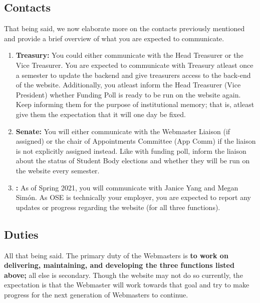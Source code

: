 \documentclass[a4paper]{article}
\begin{document}
\subsection{Contacts}

\noindent That being said, we now elaborate more on the contacts previously mentioned and provide a brief overview of what you are expected to communicate.

\begin{enumerate}
  \item \textbf{Treasury:} You could either communicate with the Head Treasurer or the Vice Treasurer. You are expected to communicate with Treasury atleast once a semester to update the backend and give treasurers access to the back-end of the website. Additionally, you atleast inform the Head Treasurer (Vice President) whether Funding Poll is ready to be run on the website again. Keep informing them for the purpose of institutional memory; that is, atleast give them the expectation that it will one day be fixed.
  \item \textbf{Senate:} You will either communicate with the Webmaster Liaison (if assigned) or the chair of Appointments Committee (App Comm) if the liaison is not explicitly assigned instead. Like with funding poll, inform the liaison about the status of Student Body elections and whether they will be run on the website every semester.
  \item \textbf{\OSE:} As of Spring 2021, you will communicate with Janice Yang and Megan Simón. As OSE is technically your employer, you are expected to report any updates or progress regarding the website (for all three functions).
\end{enumerate}

\subsection{Duties}

All that being said. The primary duty of the Webmasters is \textbf{to work on delivering, maintaining, and developing the three functions listed above;} all else is secondary. Though the website may not do so currently, the expectation is that the Webmaster will work towards that goal and try to make progress for the next generation of Webmasters to continue.
\end{document}
